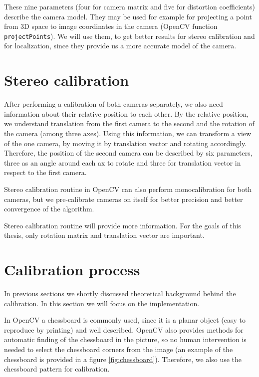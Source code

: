 These nine parameters (four for camera matrix and five for distortion
coefficients) describe the camera model. They may be used for example for
projecting a point from 3D space to image coordinates in the camera (OpenCV
function \verb+projectPoints+). We will use them, to get better results for
stereo calibration and for localization, since they provide us a more accurate
model of the camera.



\section{Stereo calibration}

After performing a calibration of both cameras separately, we also need
information about their relative position to each other. By the relative
position, we understand translation from the first camera to the second and the
rotation of the camera (among three axes). Using this information, we can
transform a view of the one camera, by moving it by translation vector and
rotating accordingly. Therefore, the position of the second camera can be
described by six parameters, three as an angle around each ax to rotate and
three for translation vector in respect to the first camera.

Stereo calibration routine in OpenCV can also perform monocalibration for both
cameras, but we pre-calibrate cameras on itself for better precision and better
convergence of the algorithm.

Stereo calibration routine will provide more information. For the goals of this
thesis, only rotation matrix and translation vector are important.

\section{Calibration process}

In previous sections we shortly discussed theoretical background behind the
calibration. In this section we will focus on the implementation.

In OpenCV a chessboard is commonly used, since it is a planar object (easy to
reproduce by printing) and well described. OpenCV also provides methods for
automatic finding of the chessboard in the picture, so no human intervention is
needed to select the chessboard corners from the image (an example of the
chessboard is provided in a figure \ref{fig:chessboard}). Therefore, we also
use the chessboard pattern for calibration.

